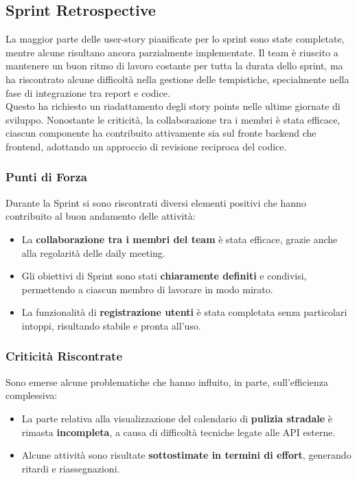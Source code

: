 \subsection{Sprint Retrospective}

La maggior parte delle user-story pianificate per lo sprint sono state completate, mentre alcune risultano ancora parzialmente implementate. Il team è riuscito a mantenere un buon ritmo di lavoro costante per tutta la durata dello sprint, ma ha riscontrato alcune difficoltà nella gestione delle tempistiche, specialmente nella fase di integrazione tra report e codice. \\ Questo ha richiesto un riadattamento degli story points nelle ultime giornate di sviluppo. Nonostante le criticità, la collaborazione tra i membri è stata efficace, ciascun componente ha contribuito attivamente sia sul fronte backend che frontend, adottando un approccio di revisione reciproca del codice.

\subsubsection{Punti di Forza}
Durante la Sprint si sono riscontrati diversi elementi positivi che hanno contribuito al buon andamento delle attività:
\begin{itemize}[leftmargin=1.5em]
    \item La \textbf{collaborazione tra i membri del team} è stata efficace, grazie anche alla regolarità delle daily meeting.
    \item Gli obiettivi di Sprint sono stati \textbf{chiaramente definiti} e condivisi, permettendo a ciascun membro di lavorare in modo mirato.
    \item La funzionalità di \textbf{registrazione utenti} è stata completata senza particolari intoppi, risultando stabile e pronta all’uso.
\end{itemize}

\subsubsection{Criticità Riscontrate}
Sono emerse alcune problematiche che hanno influito, in parte, sull'efficienza complessiva:
\begin{itemize}[leftmargin=1.5em]
    \item La parte relativa alla visualizzazione del calendario di \textbf{pulizia stradale} è rimasta \textbf{incompleta}, a causa di difficoltà tecniche legate alle API esterne.
    \item Alcune attività sono risultate \textbf{sottostimate in termini di effort}, generando ritardi e riassegnazioni.
\end{itemize}

